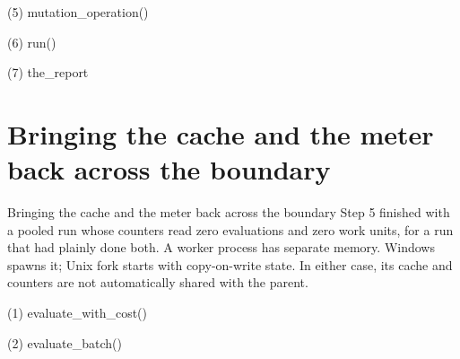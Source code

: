 \begin{frame}[fragile]{(5) mutation\_operation()}

\end{frame}

\begin{frame}[fragile]{(6) run()}

\end{frame}

\begin{frame}[fragile]{(7) the\_report}

\end{frame}


\section{Bringing the cache and the meter back across the boundary}

\begin{frame}{Bringing the cache and the meter back across the boundary}
Step 5 finished with a pooled run whose counters read zero evaluations and zero
work units, for a run that had plainly done both. A worker process has separate
memory. Windows spawns it; Unix fork starts with copy-on-write state. In either
case, its cache and counters are not automatically shared with the parent.
\end{frame}

\begin{frame}[fragile]{(1) evaluate\_with\_cost()}

\end{frame}

\begin{frame}[fragile]{(2) evaluate\_batch()}

\end{frame}

